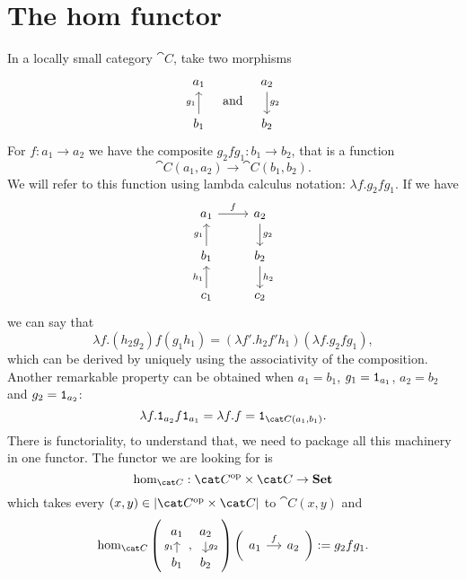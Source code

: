 
\section{The hom functor}

In a locally small  category \(\cat C\), take two morphisms
\[\begin{tikzcd}
a_1 \\
b_1 \ar["g_1", u]
\end{tikzcd} \quad\text{and}\quad \begin{tikzcd}
a_2 \ar["g_2", d] \\
b_2
\end{tikzcd}\]
For \(f : a_1 \to a_2\) we have the composite \(g_2 f g_1 : b_1 \to b_2\), that is a function
\[\cat C (a_1, a_2) \to \cat C (b_1, b_2) .\]
We will refer to this function using lambda calculus notation: \(\lambda f . g_2 f g_1\). If we have
\[\begin{tikzcd}%
a_1 \ar["f", r] & a_2 \ar["g_2", d] \\
b_1 \ar["g_1", u] & b_2 \ar["h_2", d] \\
c_1 \ar["h_1", u] & c_2
\end{tikzcd}\]
we can say that
\[\lambda f . (h_2 g_2) f (g_1 h_1) = (\lambda f' . h_2 f' h_1) (\lambda f . g_2 f g_1) ,\]
which can be derived by uniquely using the associativity of the composition. Another remarkable property can be obtained when \(a_1 = b_1\), \(g_1 = \mathtt 1_{a_1}\), \(a_2 = b_2\) and \(g_2 = \mathtt 1_{a_2}\):
\[\lambda f . \id_{a_2} f \id_{a_1} = \lambda f . f = \id_{\cat C (a_1, b_1)} .\]
There is functoriality, to understand that, we need to package all this machinery in one functor. The functor we are looking for is
\[\hom_{\cat C} : \opcat C \times \cat C \to \Set\]
which takes every \((x, y) \in \obj{\opcat C \times \cat C}\) to \(\cat C (x, y)\) and
\[\hom_{\cat C} \left(\begin{tikzcd}[row sep=small] a_1 \\ b_1 \ar["g_1", u] \end{tikzcd}, \begin{tikzcd}[row sep=small] a_2 \ar["g_2", d] \\ b_2 \end{tikzcd}\right) \left(\begin{tikzcd}[column sep=small] a_1 \ar["f", r] & a_2 \end{tikzcd}\right) := g_2 f g_1 .\]